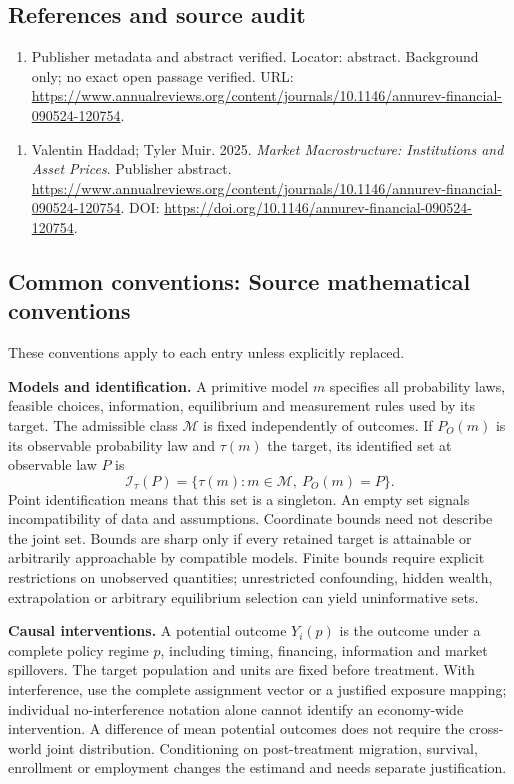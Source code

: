 \documentclass[11pt,a4paper]{article}
\begin{document}
\subsection*{References and source audit}
\begin{enumerate}
\item Publisher metadata and abstract verified. Locator: abstract. Background only; no exact open passage verified. URL: \url{https://www.annualreviews.org/content/journals/10.1146/annurev-financial-090524-120754}.
\end{enumerate}
\begin{enumerate}\raggedright
\item\hypertarget{definitions:source:30007597:1}{} Valentin Haddad; Tyler Muir. 2025. \emph{Market Macrostructure: Institutions and Asset Prices}. Publisher abstract.
\url{https://www.annualreviews.org/content/journals/10.1146/annurev-financial-090524-120754}.
DOI: \url{https://doi.org/10.1146/annurev-financial-090524-120754}.
\end{enumerate}

\subsection*{Common conventions: Source mathematical conventions}

These conventions apply to each entry unless explicitly replaced.

\textbf{Models and identification.} A primitive model \(m\) specifies all probability laws, feasible choices, information, equilibrium and measurement rules used by its target. The admissible class \(\mathcal M\) is fixed independently of outcomes. If \(P_O(m)\) is its observable probability law and \(\tau(m)\) the target, its identified set at observable law \(P\) is
\[
 \mathcal I_\tau(P)=\{\tau(m):m\in\mathcal M,\ P_O(m)=P\}.
\]
Point identification means that this set is a singleton. An empty set signals incompatibility of data and assumptions. Coordinate bounds need not describe the joint set. Bounds are sharp only if every retained target is attainable or arbitrarily approachable by compatible models. Finite bounds require explicit restrictions on unobserved quantities; unrestricted confounding, hidden wealth, extrapolation or arbitrary equilibrium selection can yield uninformative sets.

\textbf{Causal interventions.} A potential outcome \(Y_i(p)\) is the outcome under a complete policy regime \(p\), including timing, financing, information and market spillovers. The target population and units are fixed before treatment. With interference, use the complete assignment vector or a justified exposure mapping; individual no-interference notation alone cannot identify an economy-wide intervention. A difference of mean potential outcomes does not require the cross-world joint distribution. Conditioning on post-treatment migration, survival, enrollment or employment changes the estimand and needs separate justification.
\end{document}

